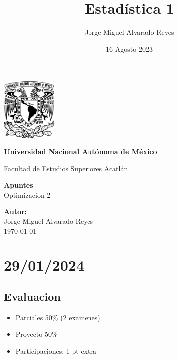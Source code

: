 \documentclass{article}
\title{Estadística 1}
\author{Jorge Miguel Alvarado Reyes}
\date{16 Agosto 2023}
\begin{document}
\begin{titlepage}
    \begin{center}
        \includegraphics[width=0.2\textwidth]{../unam.png}
        \vspace*{.5cm}

        \LARGE
        \textbf{Universidad Nacional Autónoma de México}

        \vspace{0.5cm}
        \LARGE
        Facultad de Estudios Superiores Acatlán

        \vspace{2cm}

        \textbf{Apuntes} \\
        Optimizacion 2

        \vfill

        \vspace{1cm}

        \textbf{\large Autor:} \\
        Jorge Miguel Alvarado Reyes \\
        \vspace{.5cm}
        \normalsize \today

    \end{center}
\end{titlepage}
\newpage

\tableofcontents

\newpage

\section{29/01/2024}

\subsection{Evaluacion}

\begin{itemize}
    \item Parciales 50\% (2 examenes)
    \item Proyecto 50\%
    \item Participaciones: 1 pt extra
\end{itemize}
\end{document}

